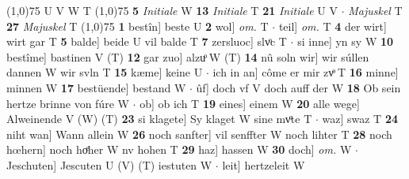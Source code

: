 \documentclass[8pt,a4paper,notitlepage]{article}
\begin{document}
\begin{table}[ht]
\begin{minipage}[t]{0.5\linewidth}
\begin{tabular}{rl}
\end{tabular}
\scriptsize
\line(1,0){75} \newline
U V W T \newline
\line(1,0){75} \newline
\textbf{5} \textit{Initiale} W  \textbf{13} \textit{Initiale} T  \textbf{21} \textit{Initiale} U V   $\cdot$ \textit{Majuskel} T  \textbf{27} \textit{Majuskel} T  \newline
\line(1,0){75} \newline
\textbf{1} bestîn] beste U \textbf{2} wol] \textit{om.} T  $\cdot$ teil] \textit{om.} T \textbf{4} der wirt] wirt gar T \textbf{5} balde] beide U vil balde T \textbf{7} zersluoc] slvͦc T  $\cdot$ si inne] yn sy W \textbf{10} bestîme] bastinen V (T) \textbf{12} gar zuo] alzuͦ W (T) \textbf{14} nû soln wir] wir súllen dannen W wir svln T \textbf{15} kæme] keine U  $\cdot$ ich in an] côme er mir zvͦ T \textbf{16} minne] minnen W \textbf{17} bestüende] bestand W  $\cdot$ ûf] doch vf V doch auff der W \textbf{18} Ob sein hertze brinne von fúre W  $\cdot$ ob] ob ich T \textbf{19} eines] einem W \textbf{20} alle wege] Alweinende V (W) (T) \textbf{23} si klagete] Sy klaget W sine mvͦte T  $\cdot$ waz] swaz T \textbf{24} niht wan] Wann allein W \textbf{26} noch sanfter] vil senffter W noch lihter T \textbf{28} noch hœhern] noch hoͤher W nv hohen T \textbf{29} haz] hassen W \textbf{30} doch] \textit{om.} W  $\cdot$ Jeschuten] Jescuten U (V) (T) iestuten W  $\cdot$ leit] hertzeleit W \newline
\end{minipage}
\end{table}
\end{document}
